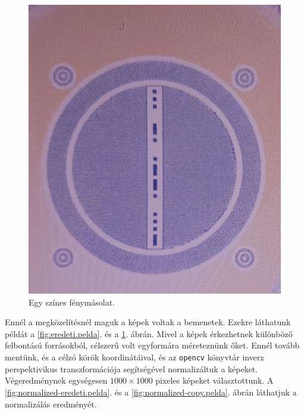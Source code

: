 \begin{figure}[h]
\begin{minipage}[c]{0.5\linewidth}
	\end{minipage}\hfill
	\begin{minipage}[c]{0.5\linewidth}
		\centering
		\includegraphics[width=\textwidth]{img/copy-pelda.png}
		\caption{Egy színes fénymásolat.}
		\label{fig:copy.pelda}
		
	\end{minipage}
	
\end{figure}

Ennél a megközelítésnél maguk a képek voltak a bemenetek. Ezekre láthatunk példát a  \ref{fig:eredeti.pelda}. és a \ref{fig:copy.pelda}. ábrán.
Mivel a képek érkezhetnek különböző felbontású forrásokból, célszerű volt
egyformára méreteznünk őket. Ennél tovább mentünk, és a célzó körök koordinátáival,
és az \texttt{opencv} könyvtár inverz perspektivikus transzformációja segítségével 
normalizáltuk a képeket. Végeredménynek egységesen $ 1000 \times 1000 $ pixeles képeket
választottunk. A \ref{fig:normalized-eredeti.pelda}. és a \ref{fig:normalized-copy.pelda}. 
ábrán láthatjuk a normalizálás eredményét.


